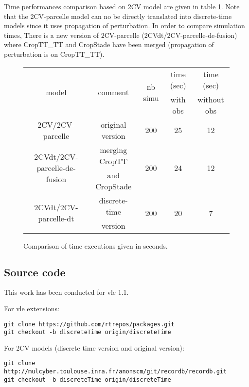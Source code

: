 \documentclass{article}
\theoremstyle{remark}
\begin{document}
Time performances comparison based on 2CV model are given in 
table \ref{table:timeprofiling}. Note that the 2CV-parcelle model
can no be directly translated into discrete-time models since
it uses propagation of perturbation. In order to compare simulation times, 
There is a new version of 2CV-parcelle (2CVdt/2CV-parcelle-de-fusion) where 
CropTT\_TT and CropStade have been merged (propagation of 
perturbation is on CropTT\_TT).  

\begin{figure}
\begin{center}
\begin{tabular}{|c|c|c|c|c|}
\hline
\multirow{2}{*}{model}                        & \multirow{2}{*}{comment} &  \multirow{2}{*}{nb simu} & time (sec)          & time (sec)          \\
~                                             & ~                        &  ~                        & with obs            & without obs         \\\hline\hline
2CV/2CV-parcelle                              & original version         &  200                      & 25                  & 12                  \\ \hline 
\multirow{2}{*}{2CVdt/2CV-parcelle-de-fusion} & merging CropTT           &  \multirow{2}{*}{200}     & \multirow{2}{*}{24} & \multirow{2}{*}{12} \\ 
~                                             & and CropStade            &  ~                        & ~                   & ~                   \\ \hline
\multirow{2}{*}{2CVdt/2CV-parcelle-dt}        & discrete-time            &  \multirow{2}{*}{200}     & \multirow{2}{*}{20} & \multirow{2}{*}{7}  \\ 
~                                             & version                  &  ~                        & ~                   & ~                   \\ \hline
\end{tabular}
\caption{\label{table:timeprofiling}Comparison of time executions given in seconds.}
\end{center}
\end{figure}

\subsection{Source code}

This work has been conducted for vle 1.1.

For vle extensions:
\begin{lstlisting}
git clone https://github.com/rtrepos/packages.git
git checkout -b discreteTime origin/discreteTime
\end{lstlisting}

For 2CV models (discrete time version and original version):
\begin{lstlisting}
git clone http://mulcyber.toulouse.inra.fr/anonscm/git/recordb/recordb.git
git checkout -b discreteTime origin/discreteTime
\end{lstlisting}

%
%
\end{document}
